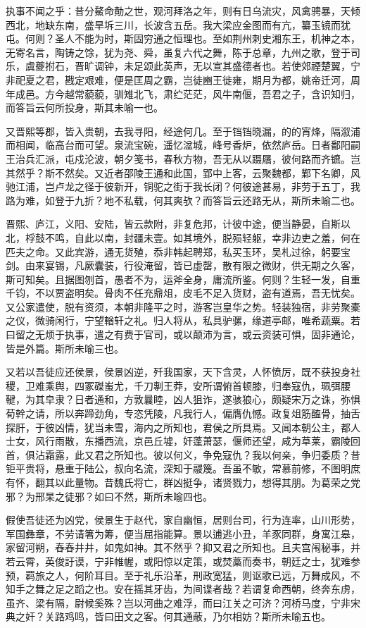 \documentclass[]{article}
\begin{document}
执事不闻之乎：昔分鰲命勣之世，观河拜洛之年，则有日乌流灾，风禽骋暴，天倾西北，地缺东南，盛旱坼三川，长波含五岳。我大梁应金图而有亢，纂玉镜而犹屯。何则？圣人不能为时，斯固穷通之恒理也。至如荆州刺史湘东王，机神之本，无寄名言，陶铸之馀，犹为尧、舜，虽复六代之舞，陈于总章，九州之歌，登于司乐，虞夔拊石，晋旷调钟，未足颂此英声，无以宣其盛德者也。若使郊禋楚翼，宁非祀夏之君，戡定艰难，便是匡周之霸，岂徒豳王徙雍，期月为都，姚帝迁河，周年成邑。方今越常藐藐，驯雉北飞，肃纻茫茫，风牛南偃，吾君之子，含识知归，而答旨云何所投身，斯其未喻一也。

又晋熙等郡，皆入贵朝，去我寻阳，经途何几。至于铛铛晓漏，的的宵烽，隔溆浦而相闻，临高台而可望。泉流宝碗，遥忆湓城，峰号香炉，依然庐岳。日者鄱阳嗣王治兵汇派，屯戍沦波，朝夕笺书，春秋方物，吾无从以蹑屩，彼何路而齐镳。岂其然乎？斯不然矣。又近者邵陵王通和此国，郢中上客，云聚魏都，鄴下名卿，风驰江浦，岂卢龙之径于彼新开，铜驼之街于我长闭？何彼途甚易，非劳于五丁，我路为难，如登于九折？地不私载，何其爽欤？而答旨云还路无从，斯所未喻二也。

晋熙、庐江，义阳、安陆，皆云款附，非复危邦，计彼中途，便当静晏，自斯以北，桴鼓不鸣，自此以南，封疆未壹。如其境外，脱殒轻躯，幸非边吏之羞，何在匹夫之命。又此宾游，通无货殖，忝非韩起聘郑，私买玉环，吴札过徐，躬要宝剑。由来宴锡，凡厥囊装，行役淹留，皆已虚罄，散有限之微财，供无期之久客，斯可知矣。且据图刎首，愚者不为，运斧全身，庸流所鉴。何则？生轻一发，自重千钧，不以贾盗明矣。骨肉不任充鼎俎，皮毛不足入货财，盗有道焉，吾无忧矣。又公家遣使，脱有资须，本朝非隆平之时，游客岂皇华之势。轻装独宿，非劳聚橐之仪，微骑闲行，宁望輶轩之礼。归人将从，私具驴骡，缘道亭邮，唯希蔬粟。若曰留之无烦于执事，遣之有费于官司，或以颠沛为言，或云资装可惧，固非通论，皆是外篇。斯所未喻三也。

又若以吾徒应还侯景，侯景凶逆，歼我国家，天下含灵，人怀愤厉，既不获投身社稷，卫难乘舆，四冢磔蚩尤，千刀剸王莽，安所谓俯首顿膝，归奉寇仇，珮弭腰鞬，为其皁隶？日者通和，方敦曩睦，凶人狙诈，遂骇狼心，颇疑宋万之诛，弥惧荀幹之请，所以奔蹄劲角，专恣凭陵，凡我行人，偏膺仇憾。政复俎筋醢骨，抽舌探肝，于彼凶情，犹当未雪，海内之所知也，君侯之所具焉。又闻本朝公主，都人士女，风行雨散，东播西流，京邑丘墟，奸蓬萧瑟，偃师还望，咸为草莱，霸陵回首，俱沾霜露，此又君之所知也。彼以何义，争免寇仇？我以何亲，争归委质？昔钜平贵将，悬重于陆公，叔向名流，深知于鬷篾。吾虽不敏，常慕前修，不图明庶有怀，翻其以此量物。昔魏氏将亡，群凶挺争，诸贤戮力，想得其朋。为葛荣之党邪？为邢杲之徒邪？如曰不然，斯所未喻四也。

假使吾徒还为凶党，侯景生于赵代，家自幽恒，居则台司，行为连率，山川形势，军国彝章，不劳请箸为筹，便当屈指能算。景以逋逃小丑，羊豕同群，身寓江皋，家留河朔，舂舂井井，如鬼如神。其不然乎？抑又君之所知也。且夫宫闱秘事，并若云霄，英俊訏谟，宁非帷幄，或阳惊以定策，或焚藁而奏书，朝廷之士，犹难参预，羁旅之人，何阶耳目。至于礼乐沿革，刑政宽猛，则讴歌已远，万舞成风，不知手之舞之足之蹈之也。安在摇其牙齿，为间谍者哉？若谓复命西朝，终奔东虏，虽齐、梁有隔，尉候奚殊？岂以河曲之难浮，而曰江关之可济？河桥马度，宁非宋典之奸？关路鸡鸣，皆曰田文之客。何其通蔽，乃尔相妨？斯所未喻五也。
\end{document}
